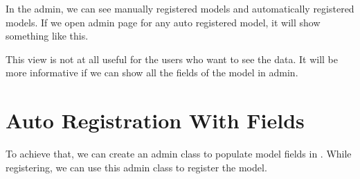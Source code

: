 \documentclass[letterpaper,12pt,english]{sphinxmanual}
\begin{document}
\begin{sphinxVerbatim}[commandchars=\\\{\}]

    
   


 

     
          
           
             
\end{sphinxVerbatim}

In the admin, we can see manually registered models and automatically registered models. If we open admin page for any auto registered model, it will show something like this.


This view is not at all useful for the users who want to see the data. It will be more informative if we can show all the fields of the model in admin.


\section{Auto Registration With Fields}
\label{\detokenize{admin_auto_register_models:auto-registration-with-fields}}
To achieve that, we can create an admin class to populate model fields in . While registering, we can use this admin class to register the model.
\end{document}
